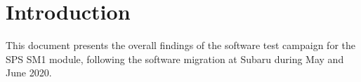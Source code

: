 \section{Introduction}

This document presents the overall findings of the software test campaign
for the SPS SM1 module, following the software migration at Subaru
during May and June 2020.

